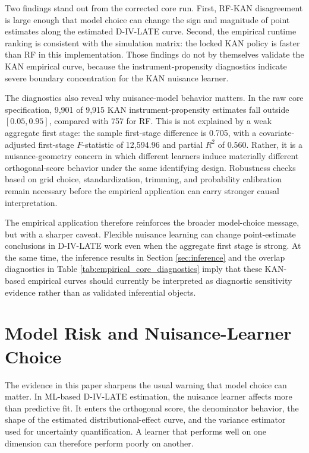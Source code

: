 \documentclass[final,3p,fleqn, 10pt]{elsarticle}
\begin{document}
Two findings stand out from the corrected core run. First, RF-KAN disagreement is large enough that model choice can change the sign and magnitude of point estimates along the estimated D-IV-LATE curve. Second, the empirical runtime ranking is consistent with the simulation matrix: the locked KAN policy is faster than RF in this implementation. Those findings do not by themselves validate the KAN empirical curve, because the instrument-propensity diagnostics indicate severe boundary concentration for the KAN nuisance learner.

The diagnostics also reveal why nuisance-model behavior matters. In the raw core specification, 9,901 of 9,915 KAN instrument-propensity estimates fall outside $[0.05, 0.95]$, compared with 757 for RF. This is not explained by a weak aggregate first stage: the sample first-stage difference is 0.705, with a covariate-adjusted first-stage $F$-statistic of 12,594.96 and partial $R^2$ of 0.560. Rather, it is a nuisance-geometry concern in which different learners induce materially different orthogonal-score behavior under the same identifying design. Robustness checks based on grid choice, standardization, trimming, and probability calibration remain necessary before the empirical application can carry stronger causal interpretation.

The empirical application therefore reinforces the broader model-choice message, but with a sharper caveat. Flexible nuisance learning can change point-estimate conclusions in D-IV-LATE work even when the aggregate first stage is strong. At the same time, the inference results in Section \ref{sec:inference} and the overlap diagnostics in Table \ref{tab:empirical_core_diagnostics} imply that these KAN-based empirical curves should currently be interpreted as diagnostic sensitivity evidence rather than as validated inferential objects.


\section{Model Risk and Nuisance-Learner Choice}
\label{sec:model_risk_choice}

The evidence in this paper sharpens the usual warning that model choice can matter. In ML-based D-IV-LATE estimation, the nuisance learner affects more than predictive fit. It enters the orthogonal score, the denominator behavior, the shape of the estimated distributional-effect curve, and the variance estimator used for uncertainty quantification. A learner that performs well on one dimension can therefore perform poorly on another.
\end{document}
